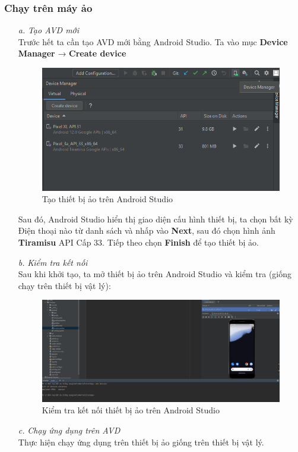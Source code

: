 \subsubsection{Chạy trên máy ảo}
\begin{enumerate}
    \item[\textit{a.}] {\textit{Tạo AVD mới}}\\
    Trước hết ta cần tạo AVD mới bằng Android Studio. Ta vào mục \textbf{Device Manager} → \textbf{Create device}
    \begin{figure}[!ht]
        \centering
        \includegraphics[width=1\textwidth]{images/createAVD.png}
        \caption{Tạo thiết bị ảo trên Android Studio}
    \end{figure}
    Sau đó, Android Studio hiển thị giao diện cấu hình thiết bị, ta chọn bất kỳ Điện thoại nào từ danh sách và nhấp vào \textbf{Next}, sau đó chọn hình ảnh \textbf{Tiramisu} API Cấp 33. Tiếp theo chọn \textbf{Finish} để tạo thiết bị ảo.
    \item[\textit{b.}] {\textit{Kiểm tra kết nối}}\\
    Sau khi khởi tạo, ta mở thiết bị ảo trên Android Studio và kiểm tra (giống chạy trên thiết bị vật lý):
    \begin{figure}[!ht]
        \centering
        \includegraphics[scale=0.3]{images/runAVD.png}
        \caption{Kiểm tra kết nối thiết bị ảo trên Android Studio}
    \end{figure}
    \item[\textit{c.}] {\textit{Chạy ứng dụng trên AVD}}\\
    Thực hiện chạy ứng dụng trên thiết bị ảo giống trên thiết bị vật lý.
\end{enumerate}

